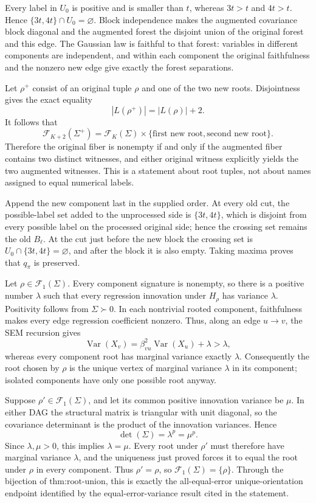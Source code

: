 Every label in \(U_0\) is positive and is smaller than \(t\), whereas \(3t>t\) and \(4t>t\).  Hence \(\{3t,4t\}\cap U_0=\varnothing\).  Block independence makes the augmented covariance block diagonal and the augmented forest the disjoint union of the original forest and this edge.  The Gaussian law is faithful to that forest: variables in different components are independent, and within each component the original faithfulness and the nonzero new edge give exactly the forest separations.

Let \(\rho^+\) consist of an original tuple \(\rho\) and one of the two new roots.  Disjointness gives the exact equality
\[
 |L(\rho^+)|=|L(\rho)|+2.
\]
It follows that
\[
 \mathcal F_{K+2}(\Sigma^+)
 =\mathcal F_K(\Sigma)\times\{\text{first new root},\text{second new root}\}.
\]
Therefore the original fiber is nonempty if and only if the augmented fiber contains two distinct witnesses, and either original witness explicitly yields the two augmented witnesses.  This is a statement about root tuples, not about names assigned to equal numerical labels.

Append the new component last in the supplied order.  At every old cut, the possible-label set added to the unprocessed side is \(\{3t,4t\}\), which is disjoint from every possible label on the processed original side; hence the crossing set remains the old \(B_\ell\).  At the cut just before the new block the crossing set is \(U_0\cap\{3t,4t\}=\varnothing\), and after the block it is also empty.  Taking maxima proves that \(q_\pi\) is preserved.

Let \(\rho\in\mathcal F_1(\Sigma)\).  Every component signature is nonempty, so there is a positive number \(\lambda\) such that every regression innovation under \(H_\rho\) has variance \(\lambda\).  Positivity follows from \(\Sigma\succ0\).  In each nontrivial rooted component, faithfulness makes every edge regression coefficient nonzero.  Thus, along an edge \(u\to v\), the SEM recursion gives
\[
 \operatorname{Var}(X_v)
 =\beta_{vu}^2\operatorname{Var}(X_u)+\lambda>\lambda,
\]
whereas every component root has marginal variance exactly \(\lambda\).  Consequently the root chosen by \(\rho\) is the unique vertex of marginal variance \(\lambda\) in its component; isolated components have only one possible root anyway.

Suppose \(\rho'\in\mathcal F_1(\Sigma)\), and let its common positive innovation variance be \(\mu\).  In either DAG the structural matrix is triangular with unit diagonal, so the covariance determinant is the product of the innovation variances.  Hence
\[
 \det(\Sigma)=\lambda^p=\mu^p.
\]
Since \(\lambda,\mu>0\), this implies \(\lambda=\mu\).  Every root under \(\rho'\) must therefore have marginal variance \(\lambda\), and the uniqueness just proved forces it to equal the root under \(\rho\) in every component.  Thus \(\rho'=\rho\), so \(\mathcal F_1(\Sigma)=\{\rho\}\).  Through the bijection of \(\text{thm:root-union}\), this is exactly the all-equal-error unique-orientation endpoint identified by the equal-error-variance result cited in the statement.

